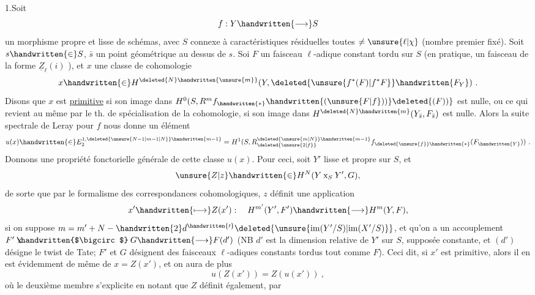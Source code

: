 
1.\quad Soit
\[
f:Y\handwritten{\longrightarrow}S
\]
un morphisme propre et lisse de schémas, avec $S$  connexe à caractéristiques résiduelles toutes $\ne\unsure{\ell|\chi}$ (nombre premier fixé). Soit $s\handwritten{\in}S$, $\bar s$ un point géométrique au dessus de $s$. Soi $F$ un faisceau $\ell$-adique constant tordu sur $S$ (en pratique, un faisceau de la forme $\underline{Z}_{\ell}(i)$ ), et $x$ une classe de cohomologie
\[
x\handwritten{\in}H^{\deleted{N}\handwritten{\unsure{m}}}(Y,\deleted{\unsure{f^*(F)|f^*F}}\handwritten{F_Y})\ .
\]
Disons que $x$ est \uline{primitive} si son image dans $H^0(S,R^m f_{\handwritten{*}}\handwritten{(\unsure{F|f}))}\deleted{(F))}$ est nulle, ou ce qui revient au même par le th. de spécialisation de la cohomologie, si son image dans $H^{\deleted{N}\handwritten{m}}(Y_{\bar s},F_{\bar s})$ est nulle. Alors la suite spectrale de Leray pour $f$ nous donne un élément
\[
u(x)\handwritten{\in}E_2^{1,\deleted{\unsure{N-1|m-1|N}}\handwritten{m-1}}=H^1(S,R^{\deleted{\unsure{m|N}}\handwritten{m-1}}_{\deleted{\unsure{2|f}}}f_{\deleted{\unsure{f}}\handwritten{*}}(F_{\handwritten{Y}}))\ .
\]
Donnons une propriété fonctorielle générale de cette classe $u(x)$. Pour ceci, soit $Y'$ lisse et propre sur $S$, et
\[
\unsure{Z|z}\handwritten{\in}H^N(Y\mathbin{\mathrm{x}}_S Y',G),
\]
de sorte que par le formalisme des correspondances cohomologiques, $z$ définit une application
\[
x'\handwritten{\longmapsto}Z(x'): \quad H^{m'}(Y',F')\handwritten{\longrightarrow}H^m(Y,F),
\]
si on suppose $m=m'+N-\handwritten{2}d^{\handwritten{\prime}}\deleted{\unsure{\mathrm{im}(Y'/S)|\mathrm{im}(X'/S)}}$, et qu'on a un accouplement $F'\mathbin{\text{\rlap{\kern.1em$\mathrm{x}$}\handwritten{$\bigcirc$}}}G\handwritten{\longrightarrow}F(d')$ (NB $d'$ est la dimension relative de $Y'$ sur $S$, supposée constante, et $(d')$ désigne le twist de Tate; $F'$ et $G$ désignent des faisceaux $\ell$-adiques constants tordus  tout comme $F$). Ceci dit, si $x'$ est primitive, alors il en est évidemment de même de $x=Z(x')$, et on aura de plus
\[
u(Z(x'))=Z(u(x'))\ ,
\]
où le deuxième membre s'explicite en notant que $Z$ définit également, par
